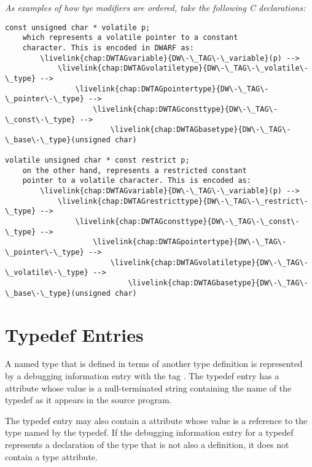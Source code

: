 \clearpage
\textit{As examples of how tye modifiers are ordered, take the following C
declarations:}

\begin{verbatim}
const unsigned char * volatile p;
    which represents a volatile pointer to a constant
    character. This is encoded in DWARF as:
        \livelink{chap:DWTAGvariable}{DW\-\_TAG\-\_variable}(p) -->
            \livelink{chap:DWTAGvolatiletype}{DW\-\_TAG\-\_volatile\-\_type} -->
                \livelink{chap:DWTAGpointertype}{DW\-\_TAG\-\_pointer\-\_type} -->
                    \livelink{chap:DWTAGconsttype}{DW\-\_TAG\-\_const\-\_type} -->
                        \livelink{chap:DWTAGbasetype}{DW\-\_TAG\-\_base\-\_type}(unsigned char)

volatile unsigned char * const restrict p;
    on the other hand, represents a restricted constant
    pointer to a volatile character. This is encoded as:
        \livelink{chap:DWTAGvariable}{DW\-\_TAG\-\_variable}(p) -->
            \livelink{chap:DWTAGrestricttype}{DW\-\_TAG\-\_restrict\-\_type} -->
                \livelink{chap:DWTAGconsttype}{DW\-\_TAG\-\_const\-\_type} -->
                    \livelink{chap:DWTAGpointertype}{DW\-\_TAG\-\_pointer\-\_type} -->
                        \livelink{chap:DWTAGvolatiletype}{DW\-\_TAG\-\_volatile\-\_type} -->
                            \livelink{chap:DWTAGbasetype}{DW\-\_TAG\-\_base\-\_type}(unsigned char)

\end{verbatim}

\section{Typedef Entries}
\label{chap:typedefentries}
A named type that is defined in terms of another type
definition is represented by a debugging information entry with
the tag . 
The typedef entry has a 
attribute whose value is a null-terminated string containing
the name of the typedef as it appears in the source program.

The typedef entry may also contain a  attribute whose
value is a reference to the type named by the typedef. If
the debugging information entry for a typedef represents
a declaration of the type that is not also a definition,
it does not contain a type attribute.

